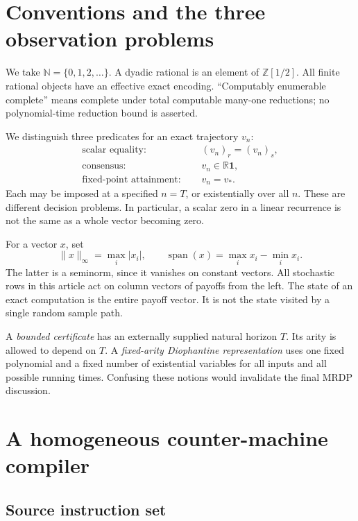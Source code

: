 \documentclass[11pt,letterpaper]{article}
\theoremstyle{definition}
\theoremstyle{remark}
\newcommand{\N}{\mathbb N}
\newcommand{\Z}{\mathbb Z}
\newcommand{\R}{\mathbb R}
\newcommand{\one}{\mathbf 1}
\newcommand{\spn}{\operatorname{span}}
\begin{document}
\section{Conventions and the three observation problems}
\label{ste:ec:sec:conventions}

We take $\N=\{0,1,2,\ldots\}$. A dyadic rational is an element of
$\Z[1/2]$. All finite rational objects have an effective exact encoding.
``Computably enumerable complete'' means complete under total computable
many-one reductions; no polynomial-time reduction bound is asserted.

We distinguish three predicates for an exact trajectory $v_n$:
\begin{align}
 \text{scalar equality: }&\quad (v_n)_r=(v_n)_s,
 \label{ste:ec:eq:scalar-observation}\\
 \text{consensus: }&\quad v_n\in\R\one,
 \label{ste:ec:eq:consensus-observation}\\
 \text{fixed-point attainment: }&\quad v_n=v_*.
 \label{ste:ec:eq:fixed-observation}
\end{align}
Each may be imposed at a specified $n=T$, or existentially over all $n$.
These are different decision problems. In particular, a scalar zero in a
linear recurrence is not the same as a whole vector becoming zero.

For a vector $x$, set
\[
 \|x\|_\infty=\max_i|x_i|,
 \qquad \spn(x)=\max_i x_i-\min_i x_i.
\]
The latter is a seminorm, since it vanishes on constant vectors. All
stochastic rows in this article act on column vectors of payoffs from the
left. The state of an exact computation is the entire payoff vector.
It is not the state visited by a single random sample path.

A \emph{bounded certificate} has an externally supplied natural horizon
$T$. Its arity is allowed to depend on $T$. A \emph{fixed-arity Diophantine
representation} uses one fixed polynomial and a fixed number of existential
variables for all inputs and all possible running times. Confusing these
notions would invalidate the final MRDP discussion.

\section{A homogeneous counter-machine compiler}
\label{ste:ec:sec:counter}

\subsection{Source instruction set}
\end{document}

